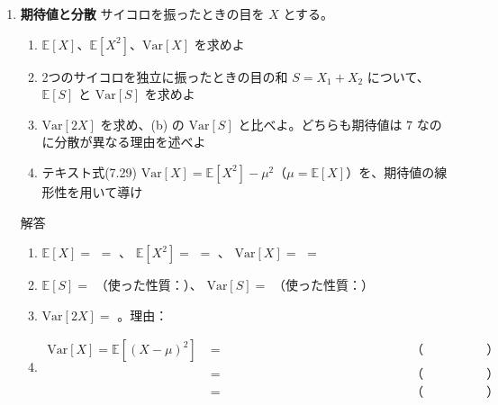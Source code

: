 \documentclass[a4paper,dvipdfmx]{jsarticle}
\newcommand{\提出期限}{2026年11月9日（月）}
\newcommand{\学籍番号}{0000000}
\newcommand{\氏名}{氏名を書く}
\newcommand{\提出日}{2026年11月9日}
\newenvironment{answer}{\begin{itembox}[l]{解答}}{\end{itembox}}
\begin{document}
\begin{enumerate}
  \item \textbf{期待値と分散}\quad
    サイコロを振ったときの目を $X$ とする。
    \begin{enumerate}
      \item $\mathbb{E}[X]$、$\mathbb{E}[X^2]$、$\mathrm{Var}[X]$ を求めよ
      \item 2つのサイコロを独立に振ったときの目の和 $S = X_1 + X_2$ について、$\mathbb{E}[S]$ と $\mathrm{Var}[S]$ を求めよ
      \item $\mathrm{Var}[2X]$ を求め、(b) の $\mathrm{Var}[S]$ と比べよ。どちらも期待値は $7$ なのに分散が異なる理由を述べよ
      \item テキスト式(7.29) $\mathrm{Var}[X] = \mathbb{E}[X^2] - \mu^2$（$\mu = \mathbb{E}[X]$）を、期待値の線形性を用いて導け
    \end{enumerate}
    \begin{answer}
      \begin{enumerate}
        \item $\mathbb{E}[X] = $ \phantom{XXXXXXXXXXXX} $= $ \phantom{XXXX}、
          $\mathbb{E}[X^2] = $ \phantom{XXXXXXXXXXXX} $= $ \phantom{XXXX}、
          $\mathrm{Var}[X] = $ \phantom{XXXXXXXX} $= $ \phantom{XXXX}
          \vspace{4mm}
        \item $\mathbb{E}[S] = $ \phantom{XXXX}（使った性質：\phantom{XXXXXXXX}）、
          $\mathrm{Var}[S] = $ \phantom{XXXX}（使った性質：\phantom{XXXXXXXX}）
          \vspace{4mm}
        \item $\mathrm{Var}[2X] = $ \phantom{XXXXXX}。理由：
          \vspace{10mm}
        \item
          \begin{align*}
            \mathrm{Var}[X] = \mathbb{E}[(X - \mu)^2]
              &= \phantom{XXXXXXXXXXXXXXXX} && \text{（　　　　　）} \\
              &= \phantom{XXXXXXXXXXXXXXXX} && \text{（　　　　　）} \\
              &= \phantom{XXXXXXXXXXXXXXXX} && \text{（　　　　　）}
          \end{align*}
      \end{enumerate}
    \end{answer}


\end{enumerate}
\end{document}

